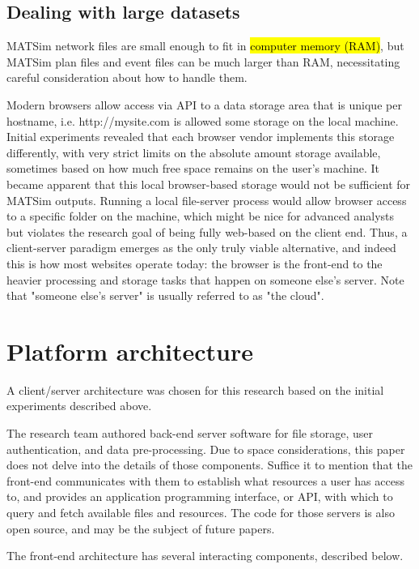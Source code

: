 \documentclass[Afour,sagev,times]{sagej}
\begin{document}
\subsection{Dealing with large datasets}

MATSim network files are small enough to fit in \hl{computer memory (RAM)}, but MATSim plan files and event files can be much larger than RAM, necessitating careful consideration about how to handle them.

Modern browsers allow access via API to a data storage area that is unique per hostname, i.e. http://mysite.com is allowed some storage on the local machine. Initial experiments revealed that each browser vendor implements this storage differently, with very strict limits on the absolute amount storage available, sometimes based on how much free space remains on the user's machine. It became apparent that this local browser-based storage would not be sufficient for MATSim outputs. Running a local file-server process would allow browser access to a specific folder on the machine, which might be nice for advanced analysts but violates the research goal of being fully web-based on the client end. Thus, a client-server paradigm emerges as the only truly viable alternative, and indeed this is how most websites operate today: the browser is the front-end to the heavier processing and storage tasks that happen on someone else's server. Note that "someone else's server" is usually referred to as "the cloud".

\section{Platform architecture}

A client/server architecture was chosen for this research based on the initial experiments described above.

The research team authored back-end server software for file storage, user authentication, and data pre-processing. Due to space considerations, this paper does not delve into the details of those components. Suffice it to mention that the front-end communicates with them to establish what resources a user has access to, and provides an application programming interface, or API, with which to query and fetch available files and resources. The code for those servers is also open source, and may be the subject of future papers.

The front-end architecture has several interacting components, described below.
\end{document}

